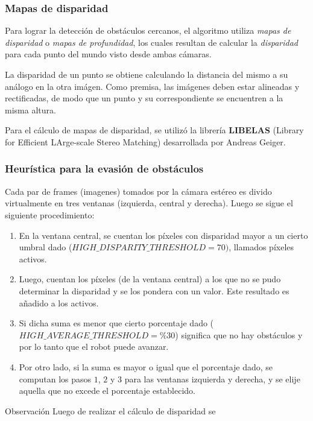 \documentclass[svgnames]{beamer}
\begin{document}
\begin{frame}
\frametitle{Mapas de disparidad}

Para lograr la detecci\'on de obst\'aculos cercanos, el algoritmo utiliza \emph{mapas de disparidad} o \emph{mapas de profundidad}, los cuales resultan de calcular la \emph{disparidad} para cada punto del mundo visto desde ambas c\'amaras.

\medskip
La disparidad de un punto se obtiene calculando la distancia del mismo a su an\'alogo en la otra im\'agen. Como premisa, las im\'agenes deben estar alineadas y rectificadas, de modo que un punto y su correspondiente se encuentren a la misma altura.

\medskip
Para el c\'alculo de mapas de disparidad, se utiliz\'o la librer\'ia {\bf LIBELAS} (Library for Efficient LArge-scale Stereo Matching) desarrollada por Andreas Geiger.

\end{frame}

\begin{frame}
\frametitle{Heur\'istica para la evasi\'on de obst\'aculos}
Cada par de frames (imagenes) tomados por la c\'amara est\'ereo es divido virtualmente en tres ventanas (izquierda, central y derecha).
Luego se sigue el siguiente procedimiento:

\begin{enumerate}
	\item En la ventana central, se cuentan los p\'ixeles con disparidad mayor a un cierto umbral dado ($HIGH\_DISPARITY\_THRESHOLD = 70)$, llamados p\'ixeles activos.
	
	\item Luego, cuentan los p\'ixeles (de la ventana central) a los que no se pudo determinar la disparidad y se los pondera con un valor. Este resultado es a\~nadido a los activos.
	
	\item Si dicha suma es menor que cierto porcentaje dado ($HIGH\_AVERAGE\_THRESHOLD = \% 30$) significa que no hay obst\'aculos y por lo tanto que el robot puede avanzar.
	
	\item Por otro lado, si la suma es mayor o igual que el porcentaje dado, se computan los pasos $1$, $2$ y $3$ para las ventanas izquierda y derecha, y se elije aquella que no excede el porcentaje establecido.
\end{enumerate}

\begin{block}{Observaci\'on}
Luego de realizar el c\'alculo de disparidad se 

\end{block}

\end{frame}
\end{document}
